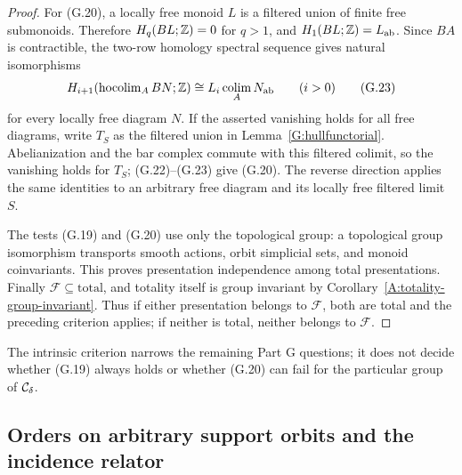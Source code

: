 \begin{proof}
For (G.20), a locally free monoid $L$ is a filtered union of
finite free submonoids. Therefore $H_q(BL;\mathbb Z)=0$ for $q>1$,
and $H_1(BL;\mathbb Z)=L_{\mathrm{ab}}$. Since $BA$ is contractible, the
two-row homology spectral sequence gives natural isomorphisms
\[
 H_{i+1}(\operatorname{hocolim}_A BN;\mathbb Z)
     \cong L_i\operatorname*{colim}_A N_{\mathrm{ab}}\qquad(i>0)
 \tag{G.23}
\]
for every locally free diagram $N$. If the asserted vanishing
holds for all free diagrams, write $T_S$ as the filtered union
in Lemma~\ref{G:hullfunctorial}. Abelianization and the bar
complex commute with this filtered colimit, so the vanishing
holds for $T_S$; (G.22)--(G.23) give (G.20). The reverse
direction applies the same identities to an arbitrary free
diagram and its locally free filtered limit $S$.

The tests (G.19) and (G.20) use only the topological group:
a topological group isomorphism transports smooth actions,
orbit simplicial sets, and monoid coinvariants. This proves
presentation independence among total presentations. Finally
$\mathcal F\subseteq\mathrm{total}$, and totality itself is
group invariant by Corollary~\ref{A:totality-group-invariant}.
Thus if either presentation belongs to $\mathcal F$, both are
total and the preceding criterion applies; if neither is
total, neither belongs to $\mathcal F$.
\end{proof}

The intrinsic criterion narrows the remaining Part G questions;
it does not decide whether (G.19) always holds or whether
(G.20) can fail for the particular group of $\mathcal C_\delta$.

\subsection{Orders on arbitrary support orbits and the incidence relator}

